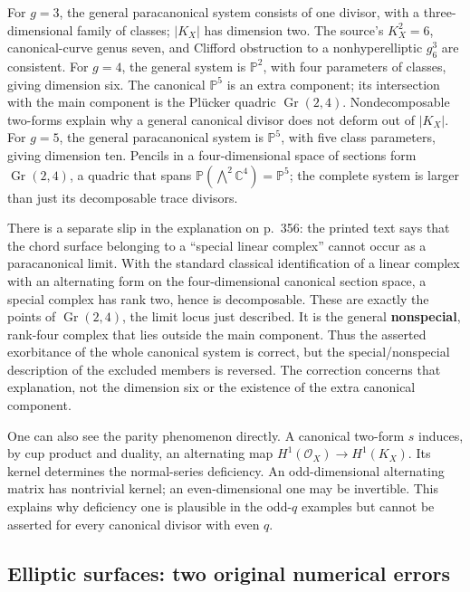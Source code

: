 For \(g=3\), the general paracanonical system consists of one divisor, with a three-dimensional family of classes; \(\vert K_X\vert \) has dimension two. The source's \(K_X^2=6\), canonical-curve genus seven, and Clifford obstruction to a nonhyperelliptic \(g^3_6\) are consistent. For \(g=4\), the general system is \(\mathbb P^2\), with four parameters of classes, giving dimension six. The canonical \(\mathbb P^5\) is an extra component; its intersection with the main component is the Plücker quadric \(\operatorname{Gr}(2,4)\). Nondecomposable two-forms explain why a general canonical divisor does not deform out of \(\vert K_X\vert \). For \(g=5\), the general paracanonical system is \(\mathbb P^5\), with five class parameters, giving dimension ten. Pencils in a four-dimensional space of sections form \(\operatorname{Gr}(2,4)\), a quadric that spans \(\mathbb P(\bigwedge^2\mathbb C^4)=\mathbb P^5\); the complete system is larger than just its decomposable trace divisors.

There is a separate slip in the explanation on p.~356: the printed text says that the chord surface belonging to a ``special linear complex'' cannot occur as a paracanonical limit. With the standard classical identification of a linear complex with an alternating form on the four-dimensional canonical section space, a special complex has rank two, hence is decomposable. These are exactly the points of \(\operatorname{Gr}(2,4)\), the limit locus just described. It is the general \textbf{nonspecial}, rank-four complex that lies outside the main component. Thus the asserted exorbitance of the whole canonical system is correct, but the special/nonspecial description of the excluded members is reversed. The correction concerns that explanation, not the dimension six or the existence of the extra canonical component.

One can also see the parity phenomenon directly. A canonical two-form \(s\) induces, by cup product and duality, an alternating map \(H^1(\mathcal O_X)\to H^1(K_X)\). Its kernel determines the normal-series deficiency. An odd-dimensional alternating matrix has nontrivial kernel; an even-dimensional one may be invertible. This explains why deficiency one is plausible in the odd-\(q\) examples but cannot be asserted for every canonical divisor with even \(q\).

\subsection{Elliptic surfaces: two original numerical errors}\label{cp2-ix-8-4}

